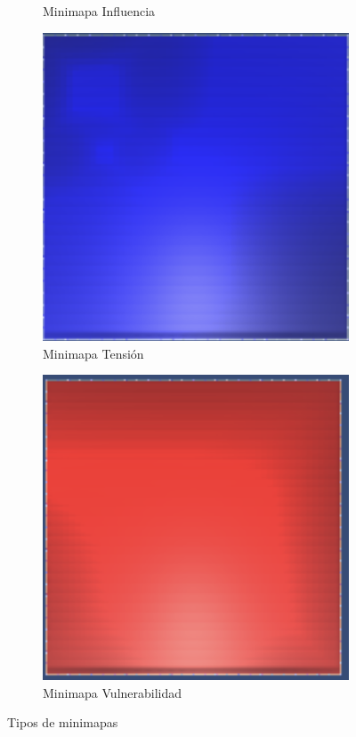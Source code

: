 \begin{figure}
\begin{subfigure}[b]{0.3\textwidth}
         \caption{Minimapa Influencia}
         \label{fig:three sin x}
     \end{subfigure}
     \hfill
     \begin{subfigure}[b]{0.3\textwidth}
         \centering
         \includegraphics[scale=0.3]{doc/images/TensionMap.png}
         \caption{Minimapa Tensión}
         \label{fig:five over x}
     \end{subfigure}
     \begin{subfigure}[b]{0.3\textwidth}
         \centering
         \includegraphics[scale=0.3]{doc/images/VulnerabilidadMap.png}
         \caption{Minimapa Vulnerabilidad}
         \label{fig:five over x}
     \end{subfigure}
        \caption{Tipos de minimapas}
        \label{fig:three graphs}
\end{figure}

